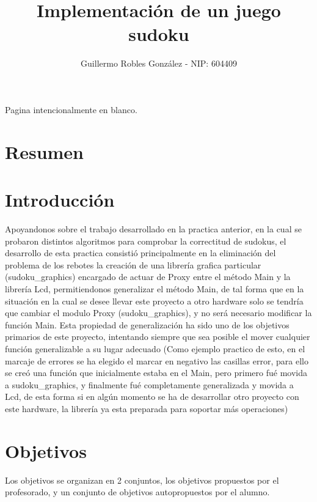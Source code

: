 \documentclass[12pt,letterpaper]{article}
\title{Implementación de un juego sudoku} %
\author{Guillermo Robles González - NIP: 604409}
\newcommand*{\blankpage}{%
\vspace*{\fill}
{\centering Pagina intencionalmente en blanco.}
\vspace{\fill}
\clearpage
}
\begin{document}
\maketitle
\blankpage
\tableofcontents
\clearpage
\section{Resumen}



\section{Introducción}
Apoyandonos sobre el trabajo desarrollado en la practica anterior, en
la cual se probaron distintos algoritmos para comprobar la correctitud
de sudokus, el desarrollo de esta practica consistió principalmente en
la eliminación del problema de los rebotes la creación de una librería
grafica particular (sudoku\_graphics) encargado de actuar de Proxy
entre el método Main y la librería Lcd, permitiendonos generalizar el
método Main, de tal forma que en la situación en la cual se desee
llevar este proyecto a otro hardware solo se tendría que cambiar el
modulo Proxy (sudoku\_graphics), y no será necesario modificar la
función Main.  Esta propiedad de generalización ha sido uno de los
objetivos primarios de este proyecto, intentando siempre que sea
posible el mover cualquier función generalizable a su lugar adecuado
(Como ejemplo practico de esto, en el marcaje de errores se ha elegido
el marcar en negativo las casillas error, para ello se creó una
función que inicialmente estaba en el Main, pero primero fué movida a
sudoku\_graphics, y finalmente fué completamente generalizada y movida
a Lcd, de esta forma si en algún momento se ha de desarrollar otro
proyecto con este hardware, la librería ya esta preparada para
soportar más operaciones)

\section{Objetivos}
Los objetivos se organizan en 2 conjuntos, los objetivos propuestos
por el profesorado, y un conjunto de objetivos autopropuestos por el
alumno.
\end{document}
